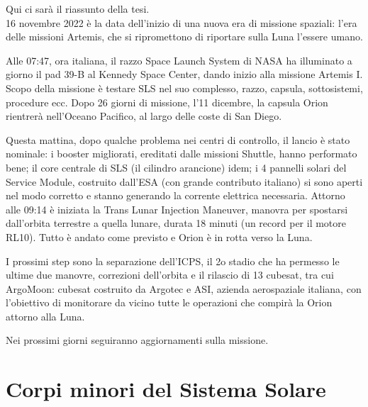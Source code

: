 \documentclass[a4paper,11pt,openright]{book}
\newenvironment{abstract}%
{\cleardoublepage%
\thispagestyle{empty}%
\null \vfill
\begin{center}%
\Huge \bfseries \abstractname 
\end{center}}%
{\vfill\null}
\begin{document}
\begin{abstract}    
Qui ci sarà il riassunto della tesi.\\
16 novembre 2022 è la data dell’inizio di una nuova era di missione spaziali: l’era delle missioni Artemis, che si ripromettono di riportare sulla Luna l’essere umano.

Alle 07:47, ora italiana, il razzo Space Launch System di NASA ha illuminato a giorno il pad 39-B al Kennedy Space Center, dando inizio alla missione Artemis I.
Scopo della missione è testare SLS nel suo complesso, razzo, capsula, sottosistemi, procedure ecc. 
Dopo 26 giorni di missione, l’11 dicembre, la capsula Orion rientrerà nell'Oceano Pacifico, al largo delle coste di San Diego.

Questa mattina, dopo qualche problema nei centri di controllo, il lancio è stato nominale: i booster migliorati, ereditati dalle missioni Shuttle, hanno performato bene; il core centrale di SLS (il cilindro arancione) idem; i 4 pannelli solari del Service Module, costruito dall’ESA (con grande contributo italiano) si sono aperti nel modo corretto e stanno generando la corrente elettrica necessaria.
Attorno alle 09:14 è iniziata la Trans Lunar Injection Maneuver, manovra per spostarsi dall'orbita terrestre a quella lunare, durata 18 minuti (un record per il motore RL10). Tutto è andato come previsto e Orion è in rotta verso la Luna.

I prossimi step sono la separazione dell'ICPS, il 2o stadio che ha permesso le ultime due manovre, correzioni dell’orbita e il rilascio di 13 cubesat, tra cui ArgoMoon: cubesat costruito da Argotec e ASI, azienda aerospaziale italiana, con l’obiettivo di monitorare da vicino tutte le operazioni che compirà la Orion attorno alla Luna.

Nei prossimi giorni seguiranno aggiornamenti sulla missione.
\end{abstract}



\tableofcontents

\listoftables

\listoffigures


\mainmatter

\chapter{Corpi minori del Sistema Solare}

\end{document}

